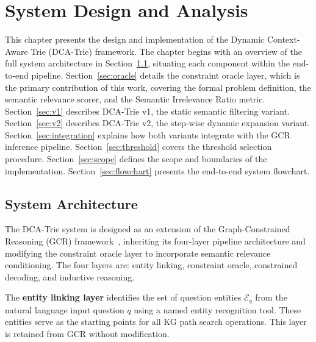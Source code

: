 
\chapter{System Design and Analysis}

This chapter presents the design and implementation of the Dynamic Context-Aware Trie (DCA-Trie) framework. The chapter begins with an overview of the full system architecture in Section~\ref{sec:architecture}, situating each component within the end-to-end pipeline. Section~\ref{sec:oracle} details the constraint oracle layer, which is the primary contribution of this work, covering the formal problem definition, the semantic relevance scorer, and the Semantic Irrelevance Ratio metric. Section~\ref{sec:v1} describes DCA-Trie v1, the static semantic filtering variant. Section~\ref{sec:v2} describes DCA-Trie v2, the step-wise dynamic expansion variant. Section~\ref{sec:integration} explains how both variants integrate with the GCR inference pipeline. Section~\ref{sec:threshold} covers the threshold selection procedure. Section~\ref{sec:scope} defines the scope and boundaries of the implementation. Section~\ref{sec:flowchart} presents the end-to-end system flowchart.

\section{System Architecture}
\label{sec:architecture}

The DCA-Trie system is designed as an extension of the Graph-Constrained Reasoning (GCR) framework~\citep{luo2024gcr}, inheriting its four-layer pipeline architecture and modifying the constraint oracle layer to incorporate semantic relevance conditioning. The four layers are: entity linking, constraint oracle, constrained decoding, and inductive reasoning.

The \textbf{entity linking layer} identifies the set of question entities $\mathcal{E}_q$ from the natural language input question $q$ using a named entity recognition tool. These entities serve as the starting points for all KG path search operations. This layer is retained from GCR without modification.

